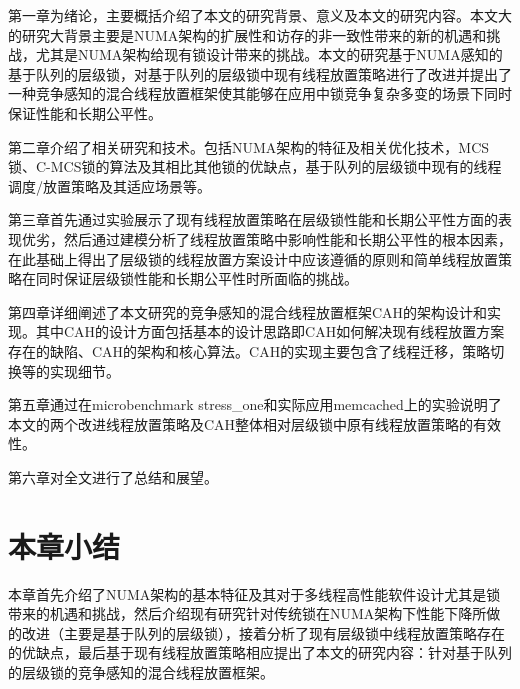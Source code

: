 第一章为绪论，主要概括介绍了本文的研究背景、意义及本文的研究内容。本文大的研究大背景主要是NUMA架构的扩展性和访存的非一致性带来的新的机遇和挑战，尤其是NUMA架构给现有锁设计带来的挑战。本文的研究基于NUMA感知的基于队列的层级锁，对基于队列的层级锁中现有线程放置策略进行了改进并提出了一种竞争感知的混合线程放置框架使其能够在应用中锁竞争复杂多变的场景下同时保证性能和长期公平性。

第二章介绍了相关研究和技术。包括NUMA架构的特征及相关优化技术，MCS锁、C-MCS锁的算法及其相比其他锁的优缺点，基于队列的层级锁中现有的线程调度/放置策略及其适应场景等。

第三章首先通过实验展示了现有线程放置策略在层级锁性能和长期公平性方面的表现优劣，然后通过建模分析了线程放置策略中影响性能和长期公平性的根本因素，在此基础上得出了层级锁的线程放置方案设计中应该遵循的原则和简单线程放置策略在同时保证层级锁性能和长期公平性时所面临的挑战。

第四章详细阐述了本文研究的竞争感知的混合线程放置框架CAH的架构设计和实现。其中CAH的设计方面包括基本的设计思路即CAH如何解决现有线程放置方案存在的缺陷、CAH的架构和核心算法。CAH的实现主要包含了线程迁移，策略切换等的实现细节。

第五章通过在microbenchmark stress\_one和实际应用memcached上的实验说明了本文的两个改进线程放置策略及CAH整体相对层级锁中原有线程放置策略的有效性。

第六章对全文进行了总结和展望。
\section{本章小结}
本章首先介绍了NUMA架构的基本特征及其对于多线程高性能软件设计尤其是锁带来的机遇和挑战，然后介绍现有研究针对传统锁在NUMA架构下性能下降所做的改进（主要是基于队列的层级锁），接着分析了现有层级锁中线程放置策略存在的优缺点，最后基于现有线程放置策略相应提出了本文的研究内容：针对基于队列的层级锁的竞争感知的混合线程放置框架。